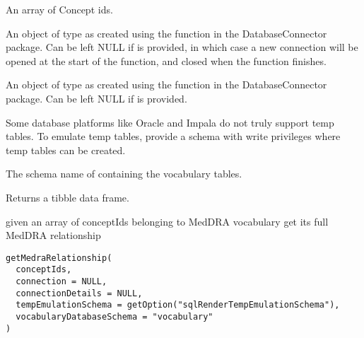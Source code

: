 \documentclass[a4paper]{book}
\begin{document}
\begin{Arguments}
\begin{ldescription}
\item[\code{conceptIds}] An array of Concept ids.

\item[\code{connection}] An object of type  as created using the
 function in the
DatabaseConnector package. Can be left NULL if 
is provided, in which case a new connection will be opened at the start
of the function, and closed when the function finishes.

\item[\code{connectionDetails}] An object of type  as created using the
 function in the
DatabaseConnector package. Can be left NULL if  is
provided.

\item[\code{tempEmulationSchema}] Some database platforms like Oracle and Impala do not truly support temp tables. To emulate temp 
tables, provide a schema with write privileges where temp tables can be created.

\item[\code{vocabularyDatabaseSchema}] The schema name of containing the vocabulary tables.
\end{ldescription}
\end{Arguments}
%
\begin{Value}
Returns a tibble data frame.
\end{Value}
%
\begin{Description}\relax
given an array of conceptIds belonging to MedDRA vocabulary get its full MedDRA relationship
\end{Description}
%
\begin{Usage}
\begin{verbatim}
getMedraRelationship(
  conceptIds,
  connection = NULL,
  connectionDetails = NULL,
  tempEmulationSchema = getOption("sqlRenderTempEmulationSchema"),
  vocabularyDatabaseSchema = "vocabulary"
)
\end{verbatim}
\end{Usage}
%
\end{document}
